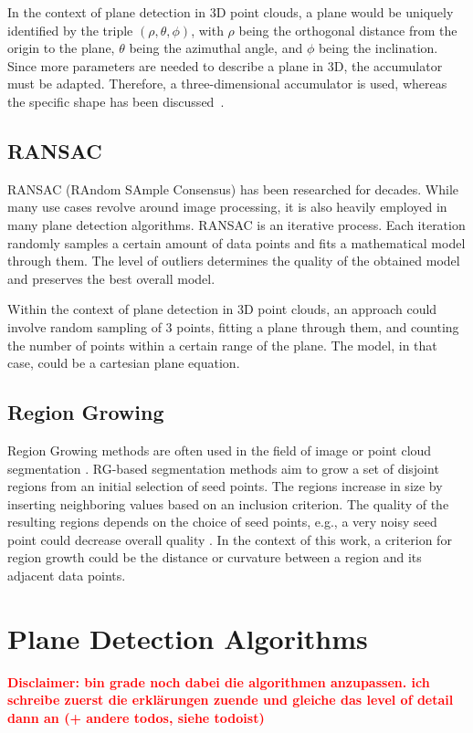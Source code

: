 \documentclass[main.tex]{subfiles}
\begin{document}
In the context of plane detection in 3D point clouds, a plane would be uniquely identified by the triple $(\rho, \theta, \phi)$, with $\rho$ being the orthogonal distance from the origin to the plane, $\theta$ being the azimuthal angle, and $\phi$ being the inclination.
Since more parameters are needed to describe a plane in 3D, the accumulator must be adapted.
Therefore, a three-dimensional accumulator is used, whereas the specific shape has been discussed~\cite*{Borrmann_Elseberg_Lingemann_Nüchter_2011}.

\subsection*{RANSAC}
RANSAC (RAndom SAmple Consensus) has been researched for decades. While many use cases revolve around image processing, it is also heavily employed in many plane detection algorithms\cite{Sun_Mordohai_2019, Yang_Forstner, Ashraf_Ahmed_2017}.
RANSAC is an iterative process. Each iteration randomly samples a certain amount of data points and fits a mathematical model through them. The level of outliers determines the quality of the obtained model and preserves the best overall model.

Within the context of plane detection in 3D point clouds, an approach could involve random sampling of 3 points, fitting a plane through them,
and counting the number of points within a certain range of the plane\cite{Yang_Forstner}. The model, in that case, could be a cartesian plane equation.

\subsection*{Region Growing}
Region Growing methods are often used in the field of image or point cloud segmentation \cite{Proença_Gao_2018, Vo_Truong-Hong_Laefer_Bertolotto_2015}.
RG-based segmentation methods aim to grow a set of disjoint regions from an initial selection of seed points. The regions increase in size by inserting neighboring values based on an inclusion criterion.
The quality of the resulting regions depends on the choice of seed points, e.g., a very noisy seed point could decrease overall quality  \cite{Malek_Rahman_Yasiran_Jumaat_Jalil_2012}.
In the context of this work, a criterion for region growth could be the distance or curvature between a region and its adjacent data points.

\section{Plane Detection Algorithms}
\textbf{\textcolor{red}{Disclaimer: bin grade noch dabei die algorithmen anzupassen. ich schreibe zuerst
        die erklärungen zuende und gleiche das level of detail dann an (+ andere todos, siehe todoist)}}
\end{document}

